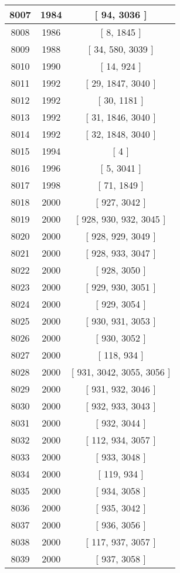 \begin{center}
\begin{longtable}[H]{|| c c c ||}
\hline
8007 & 1984 & [ 94, 3036 ] \\ 
\hline
8008 & 1986 & [ 8, 1845 ] \\ 
\hline
8009 & 1988 & [ 34, 580, 3039 ] \\ 
\hline
8010 & 1990 & [ 14, 924 ] \\ 
\hline
8011 & 1992 & [ 29, 1847, 3040 ] \\ 
\hline
8012 & 1992 & [ 30, 1181 ] \\ 
\hline
8013 & 1992 & [ 31, 1846, 3040 ] \\ 
\hline
8014 & 1992 & [ 32, 1848, 3040 ] \\ 
\hline
8015 & 1994 & [ 4 ] \\ 
\hline
8016 & 1996 & [ 5, 3041 ] \\ 
\hline
8017 & 1998 & [ 71, 1849 ] \\ 
\hline
8018 & 2000 & [ 927, 3042 ] \\ 
\hline
8019 & 2000 & [ 928, 930, 932, 3045 ] \\ 
\hline
8020 & 2000 & [ 928, 929, 3049 ] \\ 
\hline
8021 & 2000 & [ 928, 933, 3047 ] \\ 
\hline
8022 & 2000 & [ 928, 3050 ] \\ 
\hline
8023 & 2000 & [ 929, 930, 3051 ] \\ 
\hline
8024 & 2000 & [ 929, 3054 ] \\ 
\hline
8025 & 2000 & [ 930, 931, 3053 ] \\ 
\hline
8026 & 2000 & [ 930, 3052 ] \\ 
\hline
8027 & 2000 & [ 118, 934 ] \\ 
\hline
8028 & 2000 & [ 931, 3042, 3055, 3056 ] \\ 
\hline
8029 & 2000 & [ 931, 932, 3046 ] \\ 
\hline
8030 & 2000 & [ 932, 933, 3043 ] \\ 
\hline
8031 & 2000 & [ 932, 3044 ] \\ 
\hline
8032 & 2000 & [ 112, 934, 3057 ] \\ 
\hline
8033 & 2000 & [ 933, 3048 ] \\ 
\hline
8034 & 2000 & [ 119, 934 ] \\ 
\hline
8035 & 2000 & [ 934, 3058 ] \\ 
\hline
8036 & 2000 & [ 935, 3042 ] \\ 
\hline
8037 & 2000 & [ 936, 3056 ] \\ 
\hline
8038 & 2000 & [ 117, 937, 3057 ] \\ 
\hline
8039 & 2000 & [ 937, 3058 ] \\ 

\end{longtable}
\end{center}
